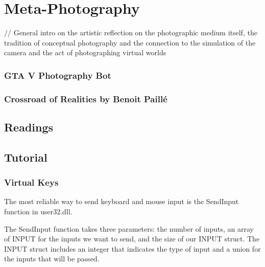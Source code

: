 \documentclass[
  openany]{book}
\begin{document}
\hypertarget{meta-photography}{%
\chapter{Meta-Photography}\label{meta-photography}}

// General intro on the artistic reflection on the photographic medium itself, the tradition of conceptual photography and the connection to the simulation of the camera and the act of photographing virtual worlds

\hypertarget{gta-v-photography-bot}{%
\subsection*{GTA V Photography Bot}\label{gta-v-photography-bot}}

\hypertarget{crossroad-of-realities-by-benoit-pailluxe9}{%
\subsection*{Crossroad of Realities by Benoit Paillé}\label{crossroad-of-realities-by-benoit-pailluxe9}}

\hypertarget{readings-7}{%
\section*{Readings}\label{readings-7}}

\hypertarget{tutorial-7}{%
\section*{Tutorial}\label{tutorial-7}}

\hypertarget{virtual-keys}{%
\subsection*{Virtual Keys}\label{virtual-keys}}

The most reliable way to send keyboard and mouse input is the SendInput function in user32.dll.

The SendInput function takes three parameters: the number of inputs, an array of INPUT for the inputs we want to send, and the size of our INPUT struct. The INPUT struct includes an integer that indicates the type of input and a union for the inputs that will be passed.
\end{document}
